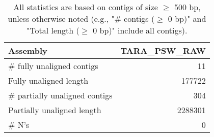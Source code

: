 \documentclass[12pt,a4paper]{article}
\begin{document}
\begin{table}[ht]
\begin{center}
\caption{All statistics are based on contigs of size $\geq$ 500 bp, unless otherwise noted (e.g., "\# contigs ($\geq$ 0 bp)" and "Total length ($\geq$ 0 bp)" include all contigs).}
\begin{tabular}{|l*{1}{|r}|}
\hline
Assembly & TARA\_PSW\_RAW \\ \hline
\# fully unaligned contigs & 11 \\ \hline
Fully unaligned length & 177722 \\ \hline
\# partially unaligned contigs & 304 \\ \hline
Partially unaligned length & 2288301 \\ \hline
\# N's & 0 \\ \hline
\end{tabular}
\end{center}
\end{table}
\end{document}
